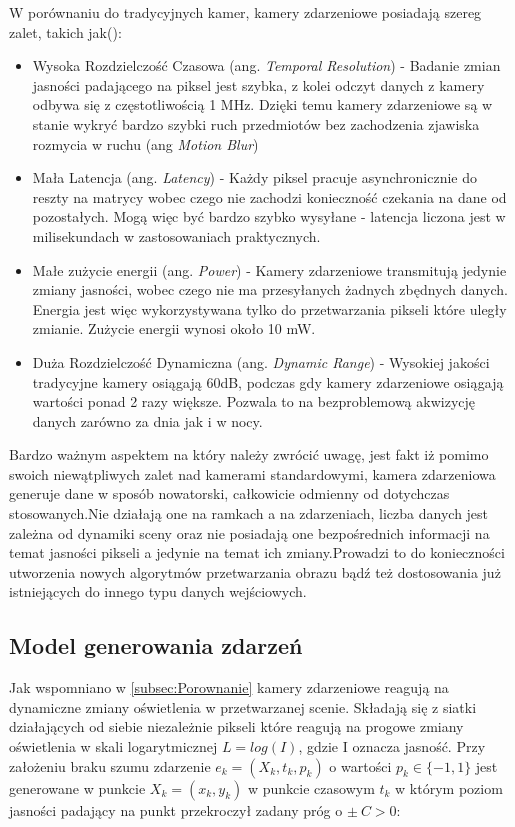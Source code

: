     \indent W porównaniu do tradycyjnych kamer, kamery zdarzeniowe posiadają szereg zalet, takich jak(\cite{Sourvey}):
    \begin{itemize}
        \item   Wysoka Rozdzielczość Czasowa (ang. \emph{Temporal Resolution}) - Badanie zmian jasności padającego na piksel jest szybka, z kolei odczyt danych z kamery odbywa się z częstotliwością 1 MHz. Dzięki temu kamery zdarzeniowe są w stanie wykryć bardzo szybki ruch przedmiotów bez
        zachodzenia zjawiska rozmycia w ruchu (ang \emph{Motion Blur})
        
        \item  Mała Latencja (ang. \emph{Latency}) - Każdy piksel pracuje asynchronicznie do reszty na matrycy wobec czego nie zachodzi konieczność czekania na dane od pozostałych. Mogą więc być bardzo szybko wysyłane - latencja liczona jest w milisekundach w zastosowaniach praktycznych.
        
        \item Małe zużycie energii (ang. \emph{Power}) - Kamery zdarzeniowe transmitują jedynie zmiany jasności, wobec czego nie ma  przesyłanych żadnych zbędnych danych. Energia jest więc wykorzystywana tylko do przetwarzania pikseli które uległy zmianie. Zużycie energii wynosi około 10 mW.
        
        \item Duża Rozdzielczość Dynamiczna (ang. \emph{Dynamic Range}) - Wysokiej jakości tradycyjne kamery osiągają 60dB, podczas gdy kamery zdarzeniowe osiągają wartości ponad 2 razy większe. Pozwala to na bezproblemową akwizycję danych zarówno za dnia jak i w nocy. 
        
    \end{itemize}

    Bardzo ważnym aspektem na który należy zwrócić uwagę, jest fakt iż pomimo swoich niewątpliwych zalet nad kamerami standardowymi, kamera zdarzeniowa generuje dane w sposób nowatorski, całkowicie odmienny od dotychczas stosowanych.Nie działają one na ramkach a na zdarzeniach, liczba danych jest zależna od dynamiki sceny oraz nie posiadają one bezpośrednich informacji na temat jasności pikseli a jedynie na temat ich zmiany.Prowadzi to do konieczności utworzenia nowych algorytmów przetwarzania obrazu bądź też dostosowania już istniejących do innego typu danych wejściowych.
    
    \subsection{Model generowania zdarzeń}
    \label{subsec:Model}
    Jak wspomniano w \ref{subsec:Porownanie} kamery zdarzeniowe reagują na dynamiczne zmiany oświetlenia w przetwarzanej scenie. Składają się z siatki działających od siebie niezależnie pikseli które reagują na progowe zmiany oświetlenia w skali logarytmicznej \(L = log(I) \), gdzie I oznacza jasność. Przy założeniu braku szumu zdarzenie  \(e_k = (X_k, t_k, p_k) \) o wartości \(p_k \in \{-1, 1\}\) jest generowane w punkcie \( X_k = (x_k, y_k) \) w punkcie czasowym \(t_k\) w którym poziom jasności padający na punkt przekroczył zadany próg o \(\pm\ C > 0\):
        
